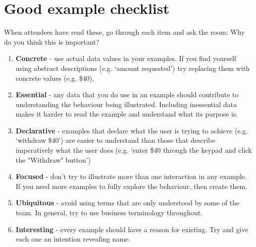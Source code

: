 \chapter*{Good example checklist}

\ifnotes

    When attendees have read these, go through each item and ask the room: Why do you think this is important?

\fi 

\ifcontent

    \begin{enumerate}
        \item \textbf{Concrete} - use actual data values in your examples. If you find yourself using abstract descriptions (e.g. `amount requested') try replacing them with concrete values (e.g. \$40).
        \item \textbf{Essential} - any data that you do use in an example should contribute to understanding the behaviour being illustrated. Including inessential data makes it harder to read the example and understand what its purpose is.
        \item \textbf{Declarative} - examples that declare what the user is trying to achieve (e.g. `withdraw \$40') are easier to understand than those that describe imperatively what the user does (e.g. `enter \$40 through the keypad and click the "Withdraw" button')
        \item \textbf{Focused} - don't try to illustrate more than one interaction in any example. If you need more examples to fully explore the behaviour, then create them.
        \item \textbf{Ubiquitous} - avoid using terms that are only understood by some of the team. In general, try to use business terminology throughout.
        \item \textbf{Interesting} - every example should have a reason for existing. Try and give each one an intention revealing name.
    \end{enumerate}

\fi
